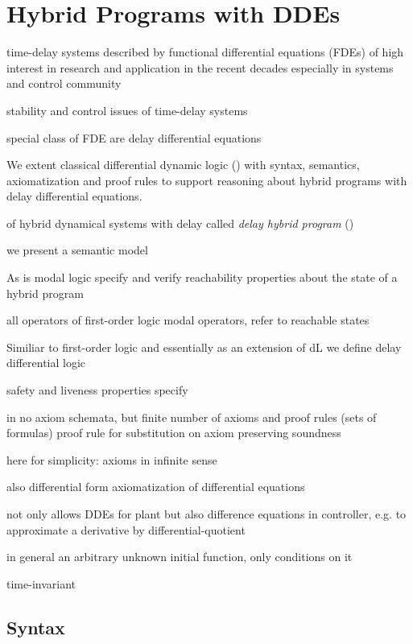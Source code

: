 \chapter{Hybrid Programs with DDEs}\label{hybrid-programs-with-ddes}

\cite{Gu03TimeDelaySys}
time-delay systems
described by functional differential equations (FDEs)
of high interest in research and application in the recent decades
especially in systems and control community

stability and control issues of time-delay systems

special class of FDE are delay differential equations


We extent classical differential dynamic logic (\dL) with syntax, semantics, axiomatization and proof rules to support reasoning about hybrid programs with delay differential equations.

of hybrid dynamical systems with delay
called \emph{delay hybrid program} (\dHP)

we present a semantic model

As \dL
\ddL is modal logic
specify and verify reachability properties about the state of a hybrid program

all operators of first-order logic
modal operators, refer to reachable states

Similiar to first-order logic and essentially as an extension of dL we define delay differential logic


safety and liveness properties specify

\dL in \cite{Platzer15Uniform} no axiom schemata, but finite number of axioms and proof rules (sets of formulas)
proof rule for substitution on axiom preserving soundness

here for simplicity: axioms in infinite sense

also differential form axiomatization of differential equations

\cite{Platzer12Complete,Platzer15Uniform}

\ddL not only allows DDEs for plant but also difference equations in controller, e.g. to approximate a derivative by differential-quotient

in general an arbitrary unknown initial function, only conditions on it

time-invariant


\section{Syntax}
    \label{sec:syntax}

